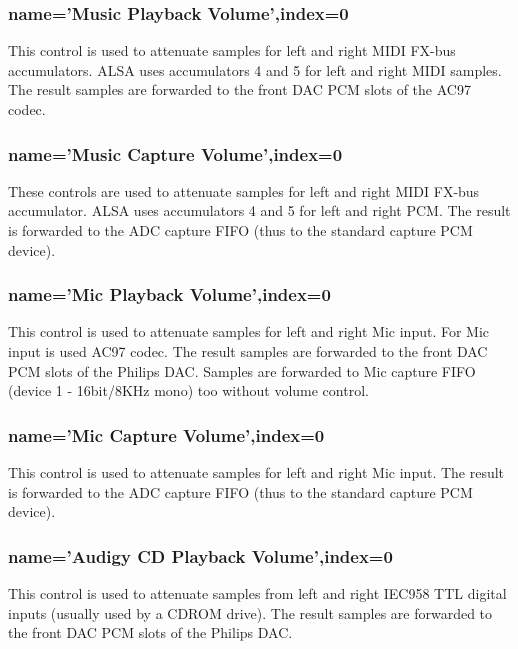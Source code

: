 \documentclass[a4paper,8pt,english]{sphinxmanual}
\begin{document}
\subsubsection{name='Music Playback Volume',index=0}
\label{sound/cards/audigy-mixer:name-music-playback-volume-index-0}
This control is used to attenuate samples for left and right MIDI FX-bus
accumulators. ALSA uses accumulators 4 and 5 for left and right MIDI samples.
The result samples are forwarded to the front DAC PCM slots of the AC97 codec.


\subsubsection{name='Music Capture Volume',index=0}
\label{sound/cards/audigy-mixer:name-music-capture-volume-index-0}
These controls are used to attenuate samples for left and right MIDI FX-bus
accumulator. ALSA uses accumulators 4 and 5 for left and right PCM.
The result is forwarded to the ADC capture FIFO (thus to the standard capture
PCM device).


\subsubsection{name='Mic Playback Volume',index=0}
\label{sound/cards/audigy-mixer:name-mic-playback-volume-index-0}
This control is used to attenuate samples for left and right Mic input.
For Mic input is used AC97 codec. The result samples are forwarded to
the front DAC PCM slots of the Philips DAC. Samples are forwarded to Mic
capture FIFO (device 1 - 16bit/8KHz mono) too without volume control.


\subsubsection{name='Mic Capture Volume',index=0}
\label{sound/cards/audigy-mixer:name-mic-capture-volume-index-0}
This control is used to attenuate samples for left and right Mic input.
The result is forwarded to the ADC capture FIFO (thus to the standard capture
PCM device).


\subsubsection{name='Audigy CD Playback Volume',index=0}
\label{sound/cards/audigy-mixer:name-audigy-cd-playback-volume-index-0}
This control is used to attenuate samples from left and right IEC958 TTL
digital inputs (usually used by a CDROM drive). The result samples are
forwarded to the front DAC PCM slots of the Philips DAC.
\end{document}
